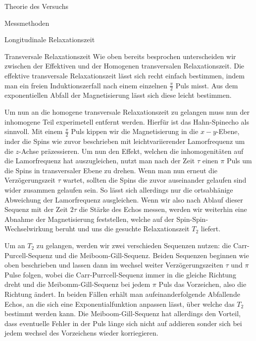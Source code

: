 \documentclass[pdftex, a4paper,11pt, twoside, ngerman]{report}
\begin{document}
\begin{chapter}{Theorie des Versuchs}
\begin{section}{Messmethoden}
\begin{subsection}{Longitudinale Relaxationszeit}
        \end{subsection}

        \begin{subsection}{Transversale Relaxationszeit}
            Wie oben bereits besprochen unterscheiden wir zwischen der Effektiven und der Homogenen transversalen Relaxationszeit.
            Die effektive transversale Relaxationszeit lässt sich recht einfach bestimmen, indem man ein freien Induktionszerfall nach einem einzelnen $\frac \pi 2$ Puls misst.
            Aus dem exponentiellen Abfall der Magnetisierung lässt sich diese leicht bestimmen.

            Um nun an die homogene transversale Relaxationszeit zu gelangen muss nun der inhomogene Teil experimetell entfernt werden.
            Hierfür ist das Hahn-Spinecho als sinnvoll.
            Mit einem $\frac \pi 2$ Puls kippen wir die Magnetisierung in die $x-y$-Ebene, inder die Spins wie zuvor beschrieben mit leichtvariierender Lamorfrequenz um die $z$-Achse präzessieren.
            Um nun den Effekt, welchen die inhomogenitäten auf die Lamorfrequenz hat auszugleichen, nutzt man nach der Zeit $\tau$ einen $\pi$ Puls um die Spins in transversaler Ebene zu drehen. 
            Wenn man nun erneut die Verzögerungszeit $\tau$ wartet, sollten die Spins die zuvor auseinander gelaufen sind wider zusammen gelaufen sein.
            So lässt sich allerdings nur die ortsabhänige Abweichung der Lamorfrequenz ausgleichen.
            Wenn wir also nach Ablauf dieser Sequenz mit der Zeit $2\tau$ die Stärke des Echos messen, werden wir weiterhin eine Abnahme der Magnetisierung feststellen, welche auf der Spin-Spin-Wechselwirkung beruht und uns die gesuchte Relaxationszeit $T_2$ liefert. 

            Um an $T_2$ zu gelangen, werden wir zwei verschieden Sequenzen nutzen:
            die Carr-Purcell-Sequenz und die Meiboom-Gill-Sequenz.
            Beiden Sequenzen beginnen wie oben beschrieben und lassen dann im wechsel weiter Verzögerungszeiten $\tau$ und $\pi$ Pulse folgen, wobei die Carr-Purrcell-Sequenz immer in die gleiche Richtung dreht und die Meibomm-Gill-Sequenz bei jedem $\pi$ Puls das Vorzeichen, also die Richtung ändert.
            In beiden Fällen erhält man aufeinanderfolgende Abfallende Echos, an die sich eine Exponentialfunktion anpassen lässt, über welche das $T_2$ bestimmt werden kann.
            Die Meiboom-Gill-Sequenz hat allerdings den Vorteil, dass eventuelle Fehler in der Puls länge sich nicht auf addieren sonder sich bei jedem wechsel des Vorzeichens wieder korriegieren.


\end{subsection}
\end{section}
\end{chapter}
\end{document}
